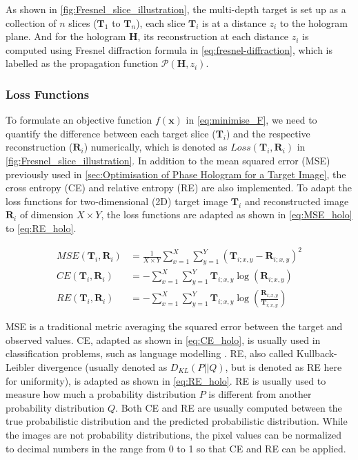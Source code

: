 As shown in \cref{fig:Fresnel_slice_illustration}, the multi-depth target is set up as a collection of $n$ slices ($\textbf{T}_1$ to $\textbf{T}_n$), each slice $\textbf{T}_i$ is at a distance $z_i$ to the hologram plane. And for the hologram $\textbf{H}$, its reconstruction at each distance $z_i$ is computed using Fresnel diffraction formula in \cref{eq:fresnel-diffraction}, which is labelled as the propagation function $\mathcal{P}(\textbf{H}, z_i)$.

\subsubsection{Loss Functions}
To formulate an objective function $f(\textbf{x})$ in \cref{eq:minimise_F}, we need to quantify the difference between each target slice ($\textbf{T}_i$) and the respective reconstruction ($\textbf{R}_i$) numerically, which is denoted as $Loss(\textbf{T}_i, \textbf{R}_i)$ in \cref{fig:Fresnel_slice_illustration}. In addition to the mean squared error (MSE) \cite{MSE_REF} previously used in \cref{sec:Optimisation of Phase Hologram for a Target Image}, the cross entropy (CE) \cite{cybenko1998mathematics} and relative entropy (RE) \cite{Kullback1951} are also implemented. To adapt the loss functions for two-dimensional (2D) target image $\textbf{T}_i$ and reconstructed image $\textbf{R}_i$ of dimension $X\times Y$, the loss functions are adapted as shown in \cref{eq:MSE_holo} to \cref{eq:RE_holo}.

\begin{align}
	MSE(\textbf{T}_i, \textbf{R}_i) & = \frac{1}{X\times Y} \sum_{x=1}^{X} \sum_{y=1}^{Y} (\textbf{T}_{i;x,y}-\textbf{R}_{i;x,y})^2\label{eq:MSE_holo}                     \\
	CE(\textbf{T}_i, \textbf{R}_i)  & = -\sum_{x=1}^{X} \sum_{y=1}^{Y} \textbf{T}_{i;x,y}\log(\textbf{R}_{i;x,y})\label{eq:CE_holo}                                        \\
	RE(\textbf{T}_i, \textbf{R}_i)  & = -\sum_{x=1}^{X} \sum_{y=1}^{Y} \textbf{T}_{i;x,y}\log\left(\frac{\textbf{R}_{i;x,y}}{\textbf{T}_{i;x,y}}\right) \label{eq:RE_holo}
\end{align}

MSE is a traditional metric averaging the squared error between the target and observed values. CE, adapted as shown in \cref{eq:CE_holo}, is usually used in classification problems, such as language modelling \cite{Liu2018}. RE, also called Kullback-Leibler divergence (usually denoted as $D_{KL}(P\vert\vert Q)$, but is denoted as RE here for uniformity), is adapted as shown in \cref{eq:RE_holo}. RE is usually used to measure how much a probability distribution $P$ is different from another probability distribution $Q$. Both CE and RE are usually computed between the true probabilistic distribution and the predicted probabilistic distribution. While the images are not probability distributions, the pixel values can be normalized to decimal numbers in the range from 0 to 1 so that CE and RE can be applied.

